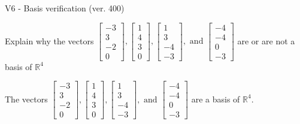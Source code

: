\begin{exercise}
  \begin{exerciseTitle}V6 - Basis verification (ver. 400)\end{exerciseTitle}
  \begin{exerciseStatement}
    Explain why the vectors \(\left[\begin{array}{r}
-3 \\
3 \\
-2 \\
0
\end{array}\right] , \left[\begin{array}{r}
1 \\
4 \\
3 \\
0
\end{array}\right] , \left[\begin{array}{r}
1 \\
3 \\
-4 \\
-3
\end{array}\right] , \text{ and } \left[\begin{array}{r}
-4 \\
-4 \\
0 \\
-3
\end{array}\right]\) are or are not a basis of \(\mathbb{R}^4\)	


  \end{exerciseStatement}
  \begin{exerciseAnswer}
   The vectors \(\left[\begin{array}{r}
-3 \\
3 \\
-2 \\
0
\end{array}\right] , \left[\begin{array}{r}
1 \\
4 \\
3 \\
0
\end{array}\right] , \left[\begin{array}{r}
1 \\
3 \\
-4 \\
-3
\end{array}\right] , \text{ and } \left[\begin{array}{r}
-4 \\
-4 \\
0 \\
-3
\end{array}\right]\) 
  	 are  a basis of \(\mathbb{R}^4\).
  


  \end{exerciseAnswer}
\end{exercise}